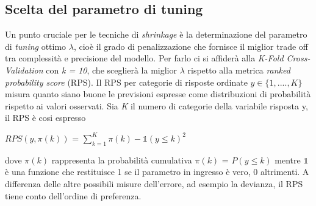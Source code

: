 
\subsection{Scelta del parametro di tuning}
Un punto cruciale per le tecniche di \emph{shrinkage} è la determinazione del parametro di \emph{tuning} ottimo $\lambda$, cioè il grado di penalizzazione che fornisce il miglior trade off tra complessità e precisione del modello. Per farlo ci si affiderà alla \emph{K-Fold Cross-Validation} con \emph{k = 10}, che sceglierà la miglior $\lambda$ rispetto alla metrica \emph{ranked probability score} (RPS). Il RPS \autocite{gneiting2007strictly} per categorie di risposte ordinate $y \in \{1,....,K\}$  misura quanto siano buone le previsioni espresse come distribuzioni di probabilità rispetto ai valori osservati.
Sia \emph{K} il numero di categorie della variabile risposta y, il RPS è cosi espresso 
\begin{center}
	$ RPS(y,\pi(k))$ = $\sum^{K}_{k = 1}{\pi(k) -  \mathds{1} (y \le k)}^2$ 
\end{center}
dove $\pi(k)$ rappresenta la probabilità cumulativa $\pi(k)$ = $P(y \le k)$ mentre $\mathds{1}$ è una funzione che restituisce 1 se il parametro in ingresso è vero, 0 altrimenti. A differenza delle altre possibili misure dell'errore, ad esempio la devianza, il RPS tiene conto dell'ordine di preferenza.




